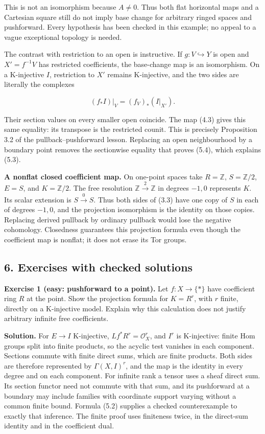 \documentclass[
  english,
  11pt,
  a4paper,
]{article}
\begin{document}
This is not an isomorphism because \(A\ne0\). Thus both flat horizontal
maps and a Cartesian square still do not imply base change for arbitrary
ringed spaces and pushforward. Every hypothesis has been checked in this
example; no appeal to a vague exceptional topology is needed.

The contrast with restriction to an open is instructive. If
\(g:V\hookrightarrow Y\) is open and \(X'=f^{-1}V\) has restricted
coefficients, the base-change map is an isomorphism. On a K-injective
\(I\), restriction to \(X'\) remains K-injective, and the two sides are
literally the complexes

\[(f_*I)|_V=(f_V)_*(I|_{X'}).
\tag{5.4}\]

Their section values on every smaller open coincide. The map (4.3) gives
this same equality: its transpose is the restricted counit. This is
precisely Proposition 3.2 of the pullback--pushforward lesson. Replacing
an open neighbourhood by a boundary point removes the sectionwise
equality that proves (5.4), which explains (5.3).

\textbf{A nonflat closed coefficient map.} On one-point spaces take
\(R=\mathbb Z\), \(S=\mathbb Z/2\), \(E=S\), and \(K=\mathbb Z/2\). The
free resolution \(\mathbb Z\xrightarrow{2}\mathbb Z\) in degrees
\(-1,0\) represents \(K\). Its scalar extension is
\(S\xrightarrow{0}S\). Thus both sides of (3.3) have one copy of \(S\)
in each of degrees \(-1,0\), and the projection isomorphism is the
identity on those copies. Replacing derived pullback by ordinary
pullback would lose the negative cohomology. Closedness guarantees this
projection formula even though the coefficient map is nonflat; it does
not erase its Tor groups.

\subsection{6. Exercises with checked
solutions}\label{projection-formula-and-base-change--6-exercises-with-checked-solutions}

\textbf{Exercise 1 (easy: pushforward to a point).} Let \(f:X\to\{*\}\)
have coefficient ring \(R\) at the point. Show the projection formula
for \(K=R^r\), with \(r\) finite, directly on a K-injective model.
Explain why this calculation does not justify arbitrary infinite free
coefficients.

\textbf{Solution.} For \(E\to I\) K-injective,
\(Lf^*R^r=\mathcal O_X^r\), and \(I^r\) is K-injective: finite Hom
groups split into finite products, so the acyclic test vanishes in each
component. Sections commute with finite direct sums, which are finite
products. Both sides are therefore represented by \(\Gamma(X,I)^r\), and
the map is the identity in every degree and on each component. For
infinite rank a tensor uses a sheaf direct sum. Its section functor need
not commute with that sum, and its pushforward at a boundary may include
families with coordinate support varying without a common finite bound.
Formula (5.2) supplies a checked counterexample to exactly that
inference. The finite proof uses finiteness twice, in the direct-sum
identity and in the coefficient dual.
\end{document}
